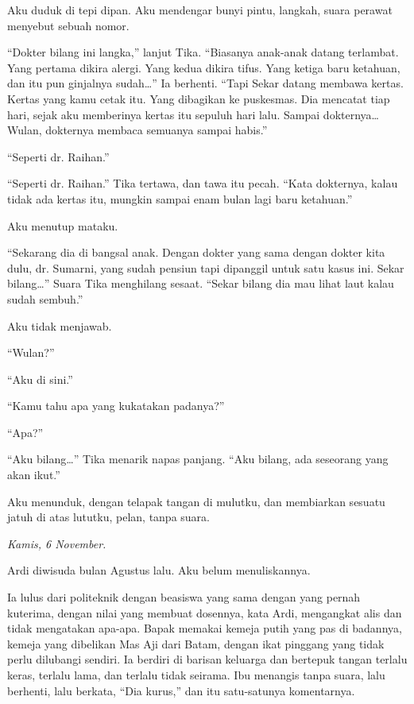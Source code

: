 \documentclass[11pt,twoside,openany]{book}
\makeatletter
\newcommand{\scenebreak}{\par\vspace{0.9em}{\centering\textsc{*\hspace{0.7em}*\hspace{0.7em}*}\par}\vspace{0.9em}\@afterindentfalse\@afterheading}
\makeatother
\begin{document}
Aku duduk di tepi dipan. Aku mendengar bunyi pintu, langkah, suara perawat menyebut sebuah nomor.

``Dokter bilang ini langka,'' lanjut Tika. ``Biasanya anak-anak datang terlambat. Yang pertama dikira alergi. Yang kedua dikira tifus. Yang ketiga baru ketahuan, dan itu pun ginjalnya sudah\ldots{}'' Ia berhenti. ``Tapi Sekar datang membawa kertas. Kertas yang kamu cetak itu. Yang dibagikan ke puskesmas. Dia mencatat tiap hari, sejak aku memberinya kertas itu sepuluh hari lalu. Sampai dokternya\ldots{} Wulan, dokternya membaca semuanya sampai habis.''

``Seperti dr. Raihan.''

``Seperti dr. Raihan.'' Tika tertawa, dan tawa itu pecah. ``Kata dokternya, kalau tidak ada kertas itu, mungkin sampai enam bulan lagi baru ketahuan.''

Aku menutup mataku.

``Sekarang dia di bangsal anak. Dengan dokter yang sama dengan dokter kita dulu, dr. Sumarni, yang sudah pensiun tapi dipanggil untuk satu kasus ini. Sekar bilang\ldots{}'' Suara Tika menghilang sesaat. ``Sekar bilang dia mau lihat laut kalau sudah sembuh.''

Aku tidak menjawab.

``Wulan?''

``Aku di sini.''

``Kamu tahu apa yang kukatakan padanya?''

``Apa?''

``Aku bilang\ldots{}'' Tika menarik napas panjang. ``Aku bilang, ada seseorang yang akan ikut.''

Aku menunduk, dengan telapak tangan di mulutku, dan membiarkan sesuatu jatuh di atas lututku, pelan, tanpa suara.

\scenebreak
\emph{Kamis, 6 November.}

Ardi diwisuda bulan Agustus lalu. Aku belum menuliskannya.

Ia lulus dari politeknik dengan beasiswa yang sama dengan yang pernah kuterima, dengan nilai yang membuat dosennya, kata Ardi, mengangkat alis dan tidak mengatakan apa-apa. Bapak memakai kemeja putih yang pas di badannya, kemeja yang dibelikan Mas Aji dari Batam, dengan ikat pinggang yang tidak perlu dilubangi sendiri. Ia berdiri di barisan keluarga dan bertepuk tangan terlalu keras, terlalu lama, dan terlalu tidak seirama. Ibu menangis tanpa suara, lalu berhenti, lalu berkata, ``Dia kurus,'' dan itu satu-satunya komentarnya.
\end{document}
